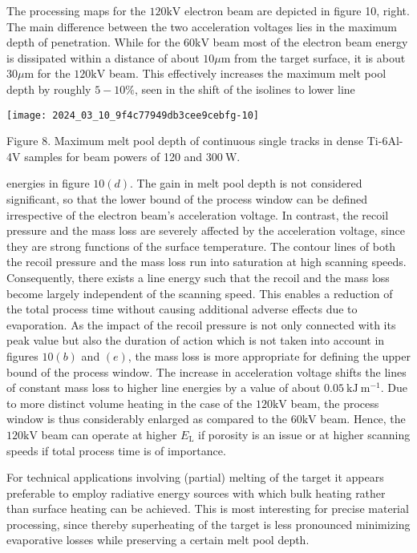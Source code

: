 \documentclass[10pt]{article}
\begin{document}
The processing maps for the $120 \mathrm{kV}$ electron beam are depicted in figure 10, right. The main difference between the two acceleration voltages lies in the maximum depth of penetration. While for the $60 \mathrm{kV}$ beam most of the electron beam energy is dissipated within a distance of about $10 \mu \mathrm{m}$ from the target surface, it is about $30 \mu \mathrm{m}$ for the $120 \mathrm{kV}$ beam. This effectively increases the maximum melt pool depth by roughly $5-10 \%$, seen in the shift of the isolines to lower line

\begin{center}
\texttt{[image: 2024\_03\_10\_9f4c77949db3cee9cebfg-10]}
\end{center}

Figure 8. Maximum melt pool depth of continuous single tracks in dense Ti-6Al-4V samples for beam powers of 120 and $300 \mathrm{~W}$.

energies in figure $10(d)$. The gain in melt pool depth is not considered significant, so that the lower bound of the process window can be defined irrespective of the electron beam's acceleration voltage. In contrast, the recoil pressure and the mass loss are severely affected by the acceleration voltage, since they are strong functions of the surface temperature. The contour lines of both the recoil pressure and the mass loss run into saturation at high scanning speeds. Consequently, there exists a line energy such that the recoil and the mass loss become largely independent of the scanning speed. This enables a reduction of the total process time without causing additional adverse effects due to evaporation. As the impact of the recoil pressure is not only connected with its peak value but also the duration of action which is not taken into account in figures $10(b)$ and $(e)$, the mass loss is more appropriate for defining the upper bound of the process window. The increase in acceleration voltage shifts the lines of constant mass loss to higher line energies by a value of about $0.05 \mathrm{~kJ} \mathrm{~m}^{-1}$. Due to more distinct volume heating in the case of the $120 \mathrm{kV}$ beam, the process window is thus considerably enlarged as compared to the $60 \mathrm{kV}$ beam. Hence, the $120 \mathrm{kV}$ beam can operate at higher $E_{\mathrm{L}}$ if porosity is an issue or at higher scanning speeds if total process time is of importance.

For technical applications involving (partial) melting of the target it appears preferable to employ radiative energy sources with which bulk heating rather than surface heating can be achieved. This is most interesting for precise material processing, since thereby superheating of the target is less pronounced minimizing evaporative losses while preserving a certain melt pool depth.
\end{document}
